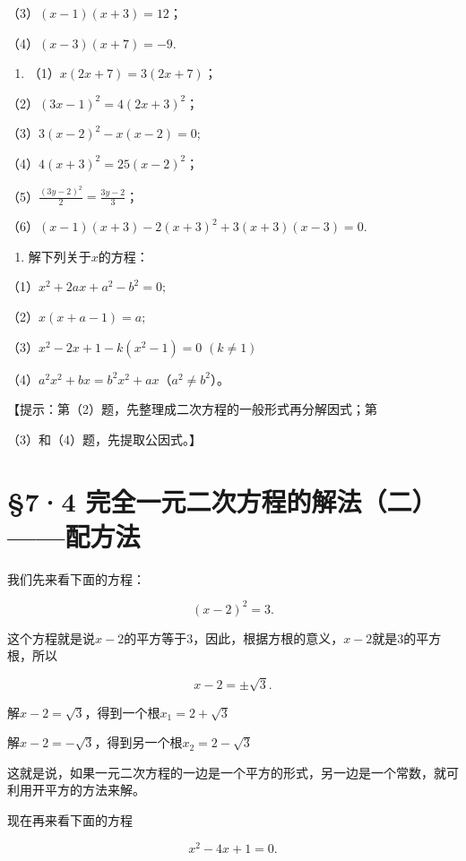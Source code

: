 （3）\((x - 1)(x + 3) = 12\)；

（4）\((x - 3)(x + 7) = -9.\)

\begin{enumerate}[start=5]
\item
  （1）\(x(2x + 7) = 3(2x + 7)\)；
\end{enumerate}

（2）\((3x - 1)^{2} = 4(2x + 3)^{2}\)；

（3）\(3(x - 2)^{2} - x(x - 2) = 0;\)

（4）\(4(x + 3)^{2} = 25(x - 2)^{2}\)；

（5）\(\frac{(3y - 2)^2}{2} = \frac{3y - 2}{3}\)；

（6）\((x - 1)(x + 3) - 2(x + 3)^2 + 3(x + 3)(x - 3) = 0.\)

\begin{enumerate}[start=6]
\item
  解下列关于\(x\)的方程：
\end{enumerate}

（1）\(x^{2} + 2ax + a^{2} - b^{2} = 0;\)

（2）\(x(x + a - 1) = a;\)

（3）\(x^{2} - 2x + 1 - k(x^{2} - 1) = 0\) \((k\neq 1)\)

（4）\(a^2 x^2 + bx = b^2 x^2 + ax\)（\(a^2 \neq b^2\)）。

【提示：第（2）题，先整理成二次方程的一般形式再分解因式；第

（3）和（4）题，先提取公因式。】

\section{§7·4 完全一元二次方程的解法（二）------配方法}

我们先来看下面的方程：

\[
(x - 2) ^ {2} = 3. \tag{1}
\]

这个方程就是说\(x - 2\)的平方等于3，因此，根据方根的意义，\(x - 2\)就是3的平方根，所以

\[
x - 2 = \pm \sqrt {3}. \tag{2}
\]

解\(x - 2 = \sqrt{3}\)，得到一个根\(x_{1} = 2 + \sqrt{3}\)

解\(x - 2 = -\sqrt{3}\)，得到另一个根\(x_{2} = 2 - \sqrt{3}\)

这就是说，如果一元二次方程的一边是一个平方的形式，另一边是一个常数，就可利用开平方的方法来解。

现在再来看下面的方程

\[
x ^ {2} - 4 x + 1 = 0.
\]

